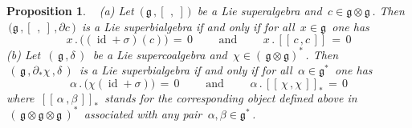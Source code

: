 \documentclass[12pt,reqno,twoside,a4paper]{amsart}
\numberwithin{equation}{section}
\newtheorem{prop}[lema]{Proposition}
\theoremstyle{definition}
\newtheorem{free text}[lema]{}
\theoremstyle{remark}
\newcommand \id{\operatorname{id}}
\newcommand{\ot}{\otimes}
\def \lieg{\mathfrak{g}}
\theoremstyle{plain}
\begin{document}
\begin{prop}  \label{prop:coboundary-liesuperbialgebra}  {\ }
%
\vskip3pt
%
   (a)\;  Let  $ \, \big(\, \lieg \, , [\,\ ,\ ] \,\big) \, $  be a Lie superalgebra and  $ \, c \in \lieg \ot \lieg \, $.  Then  $ \, \big( \lieg \, , [\,\ ,\ ] \, , \partial c \,\big) \, $  is a Lie superbialgebra if and only if
for all  $ \, x \in \lieg \, $  one has
%
  $$  x\,.\,\big((\id + \sigma)(c)\big) \, = \, 0   \qquad  \text{ and } \qquad
x\,.\,[\![\, c \, , c \,]\!] \, = \, 0  $$
%
 \vskip3pt
%
   (b)\;  Let  $ \, (\, \lieg \, , \delta \,) \, $  be a Lie supercoalgebra and
$ \, \chi \in {(\, \lieg \ot \lieg )}^* \, $.  Then  $ \, (\, \lieg \, , \partial_* \chi \, , \delta \,) \, $  is a Lie superbialgebra if and only if for all  $ \, \alpha \in \lieg^* \, $  one has
%
  $$  \alpha\,.\,\big(\chi (\id + \sigma)\big) \, = \, 0   \qquad  \text{ and }  \qquad   \alpha\,.\,{[\![\, \chi \, , \chi \,]\!]}_* \, = \, 0  $$
%
 where  $ \, {[\![\, \alpha \, , \beta \,]\!]}_* \, $  stands for the corresponding object defined above in  $ \, {(\, \lieg \ot \lieg \ot \lieg \,)}^* \, $  associated with any pair  $ \, \alpha , \beta \in \lieg^* \, $.
%
\end{prop}
\end{document}
